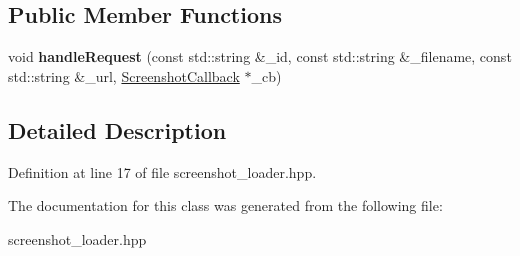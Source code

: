 \subsection*{Public Member Functions}
\begin{DoxyCompactItemize}
\item 
\hypertarget{class_screenshot_loader_ac8536cd462acca81df0873e6f78c42fe}{void {\bfseries handle\-Request} (const std\-::string \&\-\_\-id, const std\-::string \&\-\_\-filename, const std\-::string \&\-\_\-url, \hyperlink{struct_screenshot_callback}{Screenshot\-Callback} $\ast$\-\_\-cb)}\label{class_screenshot_loader_ac8536cd462acca81df0873e6f78c42fe}

\end{DoxyCompactItemize}


\subsection{Detailed Description}


Definition at line 17 of file screenshot\-\_\-loader.\-hpp.



The documentation for this class was generated from the following file\-:\begin{DoxyCompactItemize}
\item 
screenshot\-\_\-loader.\-hpp\end{DoxyCompactItemize}
